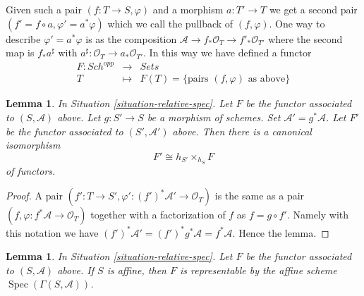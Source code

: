 \documentclass{stacks-project}
\theoremstyle{plain}
\newtheorem{lemma}[subsection]{Lemma}
\theoremstyle{definition}
\theoremstyle{remark}
\numberwithin{equation}{subsection}
\def\Spec{\mathop{\mathrm{Spec}}}
\def\Sch{\mathit{Sch}}
\begin{document}
\medskip\noindent
Given such a
pair $(f : T \to S, \varphi)$ and a morphism $a : T' \to T$ we get
a second pair $(f' = f \circ a, \varphi' = a^*\varphi)$ which we
call the pullback of $(f, \varphi)$. One way to describe
$\varphi' = a^*\varphi$ is as the composition
$\mathcal{A} \to f_*\mathcal{O}_T \to f'_*\mathcal{O}_{T'}$
where the second map is $f_*a^\sharp$ with
$a^\sharp : \mathcal{O}_T \to a_*\mathcal{O}_{T'}$.
In this way we have defined a functor
\begin{eqnarray}
\label{equation-spec}
F : \Sch^{opp} & \longrightarrow & \textit{Sets} \\
T & \longmapsto & F(T) = \{\text{pairs }(f, \varphi) \text{ as above}\}
\nonumber
\end{eqnarray}

\begin{lemma}
\label{lemma-spec-base-change}
In Situation \ref{situation-relative-spec}.
Let $F$ be the functor
associated to $(S, \mathcal{A})$ above.
Let $g : S' \to S$ be a morphism of schemes.
Set $\mathcal{A}' = g^*\mathcal{A}$. Let $F'$ be the
functor associated to $(S', \mathcal{A}')$ above.
Then there is a canonical isomorphism
$$
F' \cong h_{S'} \times_{h_S} F
$$
of functors.
\end{lemma}

\begin{proof}
A pair $(f' : T \to S', \varphi' : (f')^*\mathcal{A}' \to \mathcal{O}_T)$
is the same as a pair $(f, \varphi : f^*\mathcal{A} \to \mathcal{O}_T)$
together with a factorization of $f$ as $f = g \circ f'$. Namely with
this notation we have
$(f')^* \mathcal{A}' = (f')^*g^*\mathcal{A} = f^*\mathcal{A}$.
Hence the lemma.
\end{proof}

\begin{lemma}
\label{lemma-spec-affine}
In Situation \ref{situation-relative-spec}.
Let $F$ be the functor associated to $(S, \mathcal{A})$ above.
If $S$ is affine, then $F$ is representable by the
affine scheme $\Spec(\Gamma(S, \mathcal{A}))$.
\end{lemma}
\end{document}
